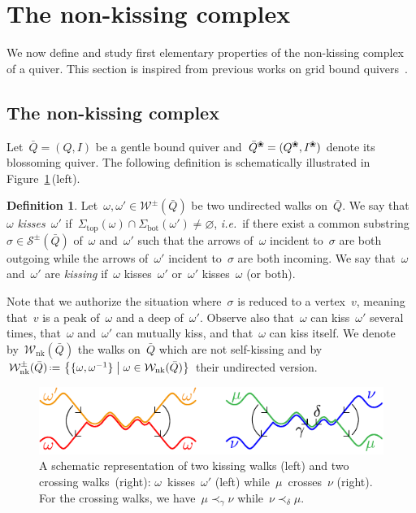 \documentclass{amsart}
\theoremstyle{definition}
\newtheorem{definition}[theorem]{Definition}
\newcommand{\set}[2]{\left\{ #1 \;\middle|\; #2 \right\}} %
\newcommand{\eqdef}{\mbox{\,\raisebox{0.2ex}{\scriptsize\ensuremath{\mathrm:}}\ensuremath{=}\,}} %
\newcommand{\fref}[1]{Figure~\ref{#1}} %
\newcommand{\ie}{\textit{i.e.}~} %
\newcommand{\darkblue}{\color{darkblue}} %
\newcommand{\defn}[1]{\textsl{\darkblue #1}} %
\newcommand{\blossom}{^\text{\ding{96}}} %
\newcommand{\strings}{\mathcal{S}} %
\newcommand{\walks}{\mathcal{W}} %
\newcommand{\NKWalks}{\mathcal{W}_\mathrm{nk}} %
\renewcommand{\top}{\mathrm{top}} %
\newcommand{\bottom}{\mathrm{bot}} %
\begin{document}

\section{The non-kissing complex}
\label{sec:nonKissingComplex}

We now define and study first elementary properties of the non-kissing complex of a quiver.
This section is inspired from previous works on grid bound quivers~\cite{PetersenPylyavskyySpeyer, SantosStumpWelker, McConville, GarverMcConville}.

\subsection{The non-kissing complex}

Let~$\bar Q = (Q,I)$ be a gentle bound quiver and~$\bar Q\blossom = (Q\blossom,I\blossom)$ denote its blossoming quiver.
The following definition is schematically illustrated in \fref{fig:kissingCrossing}\,(left).

\begin{definition}\label{def: kissing}
Let~$\omega,\omega' \in \walks^\pm(\bar Q)$ be two undirected walks on~$\bar Q$.
We say that~$\omega$ \defn{kisses}~$\omega'$ if~$\Sigma_\top(\omega) \cap \Sigma_\bottom(\omega') \ne \varnothing$, \ie if there exist a common substring~$\sigma \in \strings^\pm(\bar Q)$ of~$\omega$ and~$\omega'$ such that the arrows of~$\omega$ incident to~$\sigma$ are both outgoing while the arrows of~$\omega'$ incident to~$\sigma$ are both incoming.
We say that~$\omega$ and~$\omega'$ are \defn{kissing} if~$\omega$ kisses~$\omega'$ or~$\omega'$ kisses~$\omega$ (or both).
\end{definition}

Note that we authorize the situation where~$\sigma$ is reduced to a vertex~$v$, meaning that~$v$ is a peak of~$\omega$ and a deep of~$\omega'$.
Observe also that~$\omega$ can kiss~$\omega'$ several times, that~$\omega$ and~$\omega'$ can mutually kiss, and that~$\omega$ can kiss itself.
We denote by~$\NKWalks(\bar Q)$ the walks on~$\bar Q$ which are not self-kissing and by~$\NKWalks^\pm(\bar Q) \eqdef \set{\{\omega, \omega^{-1}\}}{\omega \in \NKWalks(\bar Q)}$ their undirected version.

\begin{figure}[b]
	\capstart
	\centerline{\includegraphics[scale=1]{kissingCrossing}}
	\caption{A schematic representation of two kissing walks (left) and two crossing walks~(right): $\omega$~kisses~$\omega'$ (left) while~$\mu$~crosses~$\nu$ (right). For the crossing walks, we have~$\mu \prec_\gamma \nu$ while~$\nu \prec_\delta \mu$.}
	\label{fig:kissingCrossing}
\end{figure}
\end{document}

